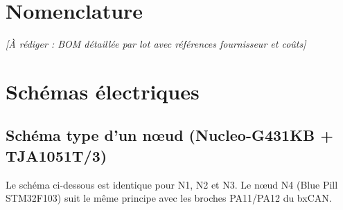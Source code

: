 \documentclass[11pt,a4paper]{article}
\newcommand{\todo}[1]{\textcolor{todo}{\textit{[À rédiger : #1]}}}
\begin{document}
\section{Nomenclature}
\todo{BOM détaillée par lot avec références fournisseur et coûts}

\section{Schémas électriques}

\subsection{Schéma type d'un nœud (Nucleo-G431KB + TJA1051T/3)}
\label{sec:noeud}

Le schéma ci-dessous est identique pour N1, N2 et N3. Le nœud N4 (Blue Pill STM32F103)
suit le même principe avec les broches PA11/PA12 du bxCAN.
\end{document}
